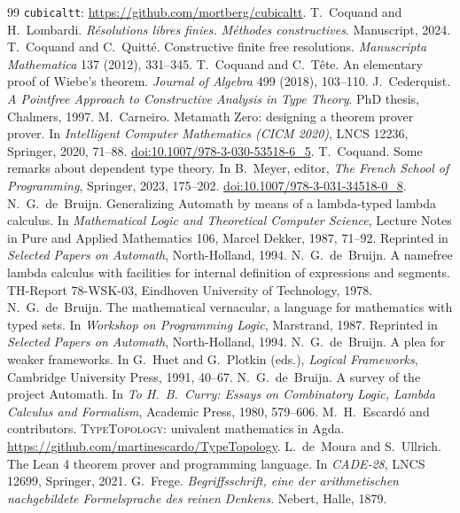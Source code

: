 \documentclass[11pt]{article}
\begin{document}
\begin{thebibliography}{99}
  \texttt{cubicaltt}: \url{https://github.com/mortberg/cubicaltt}.
 T.~Coquand and H.~Lombardi. \emph{R\'esolutions libres
  finies. M\'ethodes constructives}. Manuscript, 2024.
 T.~Coquand and C.~Quitt\'e. Constructive finite free
  resolutions. \emph{Manuscripta Mathematica} 137 (2012), 331--345.
 T.~Coquand and C.~T\^ete. An elementary proof of Wiebe's
  theorem. \emph{Journal of Algebra} 499 (2018), 103--110.
 J.~Cederquist. \emph{A Pointfree Approach to Constructive
  Analysis in Type Theory}. PhD thesis, Chalmers, 1997.
 M.~Carneiro. Metamath Zero: designing a theorem prover
  prover. In \emph{Intelligent Computer Mathematics (CICM 2020)},
  LNCS 12236, Springer, 2020, 71--88.
  \href{https://doi.org/10.1007/978-3-030-53518-6_5}{doi:10.1007/978-3-030-53518-6\_5}.
 T.~Coquand. Some remarks about dependent type theory. In
  B.~Meyer, editor, \emph{The French School of Programming}, Springer,
  2023, 175--202.
  \href{https://doi.org/10.1007/978-3-031-34518-0_8}{doi:10.1007/978-3-031-34518-0\_8}.
 N.~G.~de~Bruijn. Generalizing Automath by means of a
  lambda-typed lambda calculus. In \emph{Mathematical Logic and
  Theoretical Computer Science}, Lecture Notes in Pure and Applied
  Mathematics 106, Marcel Dekker, 1987, 71--92. Reprinted in
  \emph{Selected Papers on Automath}, North-Holland, 1994.
 N.~G.~de~Bruijn. A namefree lambda calculus with
  facilities for internal definition of expressions and segments.
  TH-Report 78-WSK-03, Eindhoven University of Technology, 1978.
 N.~G.~de~Bruijn. The mathematical vernacular, a language
  for mathematics with typed sets. In \emph{Workshop on Programming
  Logic}, Marstrand, 1987. Reprinted in \emph{Selected Papers on
  Automath}, North-Holland, 1994.
 N.~G.~de~Bruijn. A plea for weaker frameworks. In
  G.~Huet and G.~Plotkin (eds.), \emph{Logical Frameworks}, Cambridge
  University Press, 1991, 40--67.
 N.~G.~de~Bruijn. A survey of the project Automath. In
  \emph{To H.~B.~Curry: Essays on Combinatory Logic, Lambda Calculus and
  Formalism}, Academic Press, 1980, 579--606.
 M.~H.~Escard\'o and contributors. \textsc{TypeTopology}: univalent mathematics in Agda.
  \url{https://github.com/martinescardo/TypeTopology}.
 L.~de~Moura and S.~Ullrich. The Lean 4 theorem prover and
  programming language. In \emph{CADE-28}, LNCS 12699, Springer, 2021.
 G.~Frege. \emph{Begriffsschrift, eine der arithmetischen
  nachgebildete Formelsprache des reinen Denkens}. Nebert, Halle, 1879.

\end{thebibliography}
\end{document}
